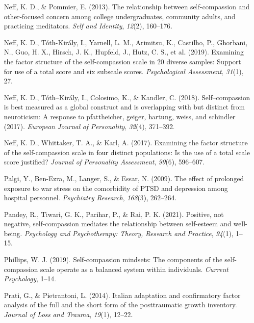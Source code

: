 \documentclass[
  man]{apa7}
\newlength{\cslhangindent}
\newlength{\cslentryspacingunit} %
\newenvironment{CSLReferences}[2] %
 {%
  \setlength{\parindent}{0pt}
  \ifodd #1
  \let\oldpar\par
  \def\par{\hangindent=\cslhangindent\oldpar}
  \fi
  \setlength{\parskip}{#2\cslentryspacingunit}
 }%
 {}
\begin{document}
\begin{CSLReferences}{1}{0}
\leavevmode{}%
Neff, K. D., \& Pommier, E. (2013). The relationship between self-compassion and other-focused concern among college undergraduates, community adults, and practicing meditators. \emph{Self and Identity}, \emph{12}(2), 160--176.

\leavevmode{}%
Neff, K. D., Tóth-Király, I., Yarnell, L. M., Arimitsu, K., Castilho, P., Ghorbani, N., Guo, H. X., Hirsch, J. K., Hupfeld, J., Hutz, C. S., et al. (2019). Examining the factor structure of the self-compassion scale in 20 diverse samples: Support for use of a total score and six subscale scores. \emph{Psychological Assessment}, \emph{31}(1), 27.

\leavevmode{}%
Neff, K. D., Tóth--Király, I., Colosimo, K., \& Kandler, C. (2018). Self--compassion is best measured as a global construct and is overlapping with but distinct from neuroticism: A response to pfattheicher, geiger, hartung, weiss, and schindler (2017). \emph{European Journal of Personality}, \emph{32}(4), 371--392.

\leavevmode{}%
Neff, K. D., Whittaker, T. A., \& Karl, A. (2017). Examining the factor structure of the self-compassion scale in four distinct populations: Is the use of a total scale score justified? \emph{Journal of Personality Assessment}, \emph{99}(6), 596--607.

\leavevmode{}%
Palgi, Y., Ben-Ezra, M., Langer, S., \& Essar, N. (2009). The effect of prolonged exposure to war stress on the comorbidity of PTSD and depression among hospital personnel. \emph{Psychiatry Research}, \emph{168}(3), 262--264.

\leavevmode{}%
Pandey, R., Tiwari, G. K., Parihar, P., \& Rai, P. K. (2021). Positive, not negative, self-compassion mediates the relationship between self-esteem and well-being. \emph{Psychology and Psychotherapy: Theory, Research and Practice}, \emph{94}(1), 1--15.

\leavevmode{}%
Phillips, W. J. (2019). Self-compassion mindsets: The components of the self-compassion scale operate as a balanced system within individuals. \emph{Current Psychology}, 1--14.

\leavevmode{}%
Prati, G., \& Pietrantoni, L. (2014). Italian adaptation and confirmatory factor analysis of the full and the short form of the posttraumatic growth inventory. \emph{Journal of Loss and Trauma}, \emph{19}(1), 12--22.


\end{CSLReferences}
\end{document}

